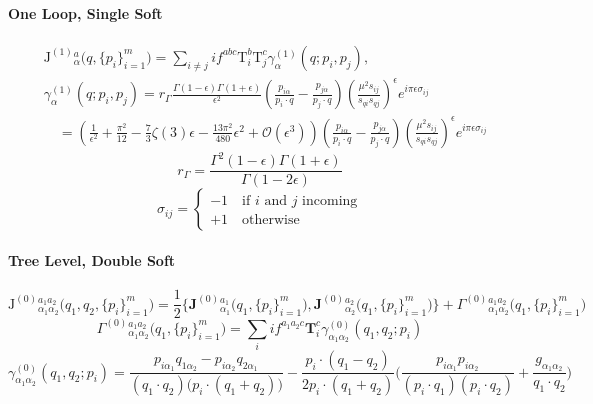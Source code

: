 \documentclass[a4paper,11pt]{article}
\begin{document}
\paragraph{One Loop, Single Soft}
\begin{align}
&\bm{\mathrm{J}}^{(1)}{}^{a}_{\alpha}\big( q,\{ p_i \}_{i=1}^m \big) =  \sum_{i \neq j} i f^{abc} \bm{\mathrm{T}}_i^b \bm{\mathrm{T}}_j^c \gamma^{(1)}_{\alpha}(q; p_i, p_j), \\
&\gamma^{(1)}_{\alpha}(q; p_i, p_j) = r_\Gamma \frac{\Gamma(1 - \epsilon) \Gamma(1 + \epsilon)}{\epsilon^2} \left(\frac{p_{i\alpha}}{p_i \cdot q} - \frac{p_{j \alpha}}{p_j \cdot q} \right) \left(\frac{\mu^2 s_{ij}}{s_{qi} s_{qj}} \right)^\epsilon e^{i \pi \epsilon \sigma_{ij}} \\ 
& \quad = \left(\frac{1}{\epsilon^2} + \frac{\pi^2}{12} - \frac{7}{3} \zeta(3) \epsilon - \frac{13 \pi^2}{480} \epsilon^2 + \mathcal{O}(\epsilon^3) \right) \left(\frac{p_{i\alpha}}{p_i \cdot q} - \frac{p_{j \alpha}}{p_j \cdot q} \right) \left(\frac{\mu^2 s_{ij}}{s_{qi} s_{qj}} \right)^\epsilon e^{i \pi \epsilon \sigma_{ij}}
\end{align}
%
\begin{equation}
r_\Gamma = \frac{\Gamma^2 (1 - \epsilon) \Gamma (1 + \epsilon)}{\Gamma(1 - 2 \epsilon)}
\end{equation}
%
\begin{equation}
\sigma_{ij} = \begin{cases} -1 \quad \text{if } i \text{ and } j \text{ incoming} \\
+1 \quad \text{otherwise}
\end{cases}
\end{equation}
%
\paragraph{Tree Level, Double Soft}
\begin{equation}
\bm{\mathrm{J}}^{(0)}{}^{a_1 a_2}_{\alpha_1 \alpha_2}\big( q_1, q_2,\{ p_i \}_{i=1}^m \big) = \frac{1}{2} \Big \lbrace \mathbf{J}^{(0)}{}^{a_1}_{\alpha_1} \big( q_1, \{p_i \}_{i = 1}^m \big), \mathbf{J}^{(0)}{}^{a_2}_{\alpha_2}  \big( q_1, \{p_i \}_{i = 1}^m \big) \Big \rbrace + \Gamma^{(0)}{}^{a_1 a_2}_{\alpha_1 \alpha_2} \big( q_1, \{p_i \}_{i = 1}^m \big)
\end{equation}
%
\begin{equation}
\Gamma^{(0)}{}^{a_1 a_2}_{\alpha_1 \alpha_2} \big( q_1, \{p_i \}_{i = 1}^m \big) = \sum_i i f^{a_1 a_2 c} \mathbf{T}_i^c \gamma^{(0)}_{\alpha_1 \alpha_2}(q_1, q_2; p_i)
\end{equation}
%
\begin{equation}
\gamma^{(0)}_{\alpha_1 \alpha_2}(q_1, q_2; p_i) = \frac{p_{i\alpha_1} q_{1\alpha_2} - p_{i \alpha_2} q_{2 \alpha_1}}{(q_1 \cdot q_2) \big( p_i \cdot (q_1 + q_2)\big)} - \frac{p_i \cdot (q_1 - q_2)}{2 p_i \cdot ( q_1 + q_2 )} \bigg( \frac{p_{i \alpha_1} p_{i \alpha_2}}{(p_i \cdot q_1) (p_i \cdot q_2)} + \frac{g_{\alpha_1\alpha_2}}{q_1 \cdot q_2} \bigg)
\end{equation}
%
\end{document}
